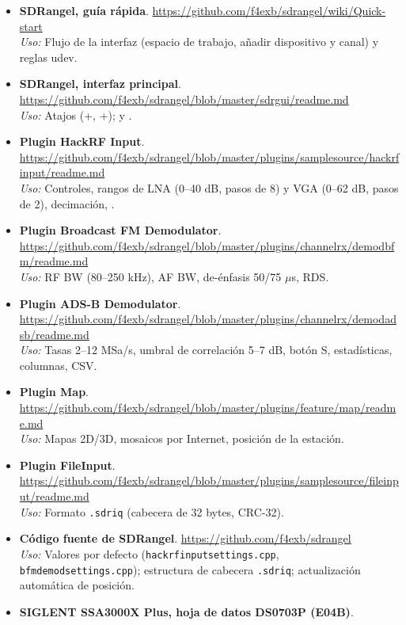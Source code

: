 \begin{itemize}[itemsep=0.45em]
  \item \textbf{SDRangel, guía rápida}. \url{https://github.com/f4exb/sdrangel/wiki/Quick-start}\\
    \emph{Uso:} Flujo de la interfaz (espacio de trabajo, añadir dispositivo y canal) y reglas udev.
  \item \textbf{SDRangel, interfaz principal}. \url{https://github.com/f4exb/sdrangel/blob/master/sdrgui/readme.md}\\
    \emph{Uso:} Atajos (+, +);  y .
  \item \textbf{Plugin HackRF Input}. \url{https://github.com/f4exb/sdrangel/blob/master/plugins/samplesource/hackrfinput/readme.md}\\
    \emph{Uso:} Controles, rangos de LNA (0--40 dB, pasos de 8) y VGA (0--62 dB, pasos de 2), decimación, .
  \item \textbf{Plugin Broadcast FM Demodulator}. \url{https://github.com/f4exb/sdrangel/blob/master/plugins/channelrx/demodbfm/readme.md}\\
    \emph{Uso:} RF BW (80--250 kHz), AF BW, de-énfasis 50/75 $\mu$s, RDS.
  \item \textbf{Plugin ADS-B Demodulator}. \url{https://github.com/f4exb/sdrangel/blob/master/plugins/channelrx/demodadsb/readme.md}\\
    \emph{Uso:} Tasas 2--12 MSa/s, umbral de correlación 5--7 dB, botón S, estadísticas, columnas, CSV.
  \item \textbf{Plugin Map}. \url{https://github.com/f4exb/sdrangel/blob/master/plugins/feature/map/readme.md}\\
    \emph{Uso:} Mapas 2D/3D, mosaicos por Internet, posición de la estación.
  \item \textbf{Plugin FileInput}. \url{https://github.com/f4exb/sdrangel/blob/master/plugins/samplesource/fileinput/readme.md}\\
    \emph{Uso:} Formato \texttt{.sdriq} (cabecera de 32 bytes, CRC-32).
  \item \textbf{Código fuente de SDRangel}. \url{https://github.com/f4exb/sdrangel}\\
    \emph{Uso:} Valores por defecto (\texttt{hackrfinputsettings.cpp}, \texttt{bfmdemodsettings.cpp}); estructura de cabecera \texttt{.sdriq}; actualización automática de posición.
  \item \textbf{SIGLENT SSA3000X Plus, hoja de datos DS0703P (E04B)}.\\

\end{itemize}
